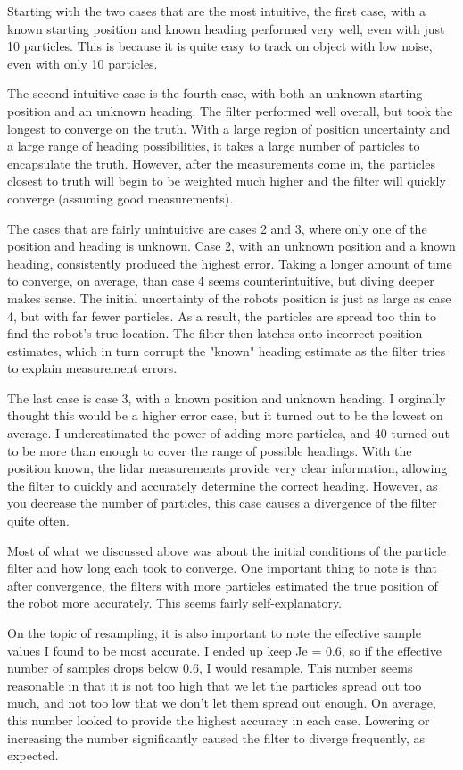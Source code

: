 \documentclass[11pt, letterpaper, twocolumn]{article}
\begin{document}
Starting with the two cases that are the most intuitive, the first case, 
with a known starting position and known heading performed very well, even
with just 10 particles. This is because it is quite easy to track on object
with low noise, even with only 10 particles. 

The second intuitive case is the fourth case, with both an unknown starting
position and an unknown heading. The filter performed well overall, but took
the longest to converge on the truth. With a large region of position uncertainty
and a large range of heading possibilities, it takes a large number of
particles to encapsulate the truth. However, after the measurements come in,
the particles closest to truth will begin to be weighted much higher and
the filter will quickly converge (assuming good measurements).

The cases that are fairly unintuitive are cases 2 and 3, where only one
of the position and heading is unknown. Case 2, with an unknown position
and a known heading, consistently produced the highest error. Taking a longer
amount of time to converge, on average, than case 4 seems counterintuitive,
but diving deeper makes sense. The initial uncertainty of the robots
position is just as large as case 4, but with far fewer particles. As a 
result, the particles are spread too thin to find the robot's true location.
The filter then latches onto incorrect position estimates, which in turn
corrupt the "known" heading estimate as the filter tries to explain
measurement errors. 

The last case is case 3, with a known position and unknown heading. I orginally
thought this would be a higher error case, but it turned out to be the lowest
on average. I underestimated the power of adding more particles, and 40
turned out to be more than enough to cover the range of possible headings.
With the position known, the lidar measurements provide very clear information,
allowing the filter to quickly and accurately determine the correct heading.
However, as you decrease the number of particles, this case causes
a divergence of the filter quite often.

Most of what we discussed above was about the initial conditions of the
particle filter and how long each took to converge. One important thing
to note is that after convergence, the filters with more particles estimated
the true position of the robot more accurately. This seems fairly self-explanatory.

On the topic of resampling, it is also important to note the effective
sample values I found to be most accurate. I ended up keep Je = 0.6, so 
if the effective number of samples drops below 0.6, I would resample. This
number seems reasonable in that it is not too high that we let the particles
spread out too much, and not too low that we don't let them spread out enough.
On average, this number looked to provide the highest accuracy in each case.
Lowering or increasing the number significantly caused the filter to 
diverge frequently, as expected.
\end{document}
